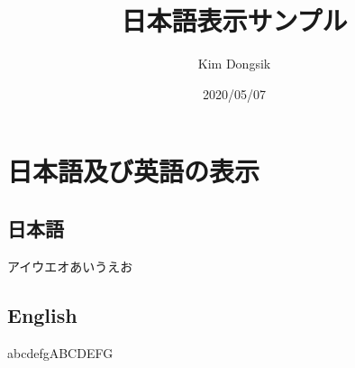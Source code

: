 \documentclass[a4paper]{bxjsarticle}
\title{日本語表示サンプル}
\author{Kim Dongsik}
\date{2020/05/07}
\begin{document}
\pagestyle{headings}
\maketitle


\section{日本語及び英語の表示}
\subsection{日本語}
アイウエオあいうえお
\subsection{English}
abcdefgABCDEFG
\end{document}
